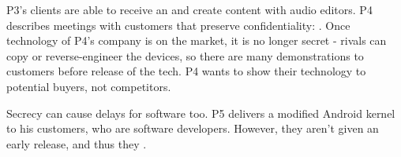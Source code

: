 P3's clients are able to receive an  and create content with audio editors.
P4 describes meetings with customers that preserve confidentiality:
.
Once technology of P4's company is on the market, it is no longer secret - rivals can copy or reverse-engineer the devices, so there are many demonstrations to customers before release of the tech.
P4 wants to show their technology to potential buyers, not competitors. %


Secrecy can cause delays for software too.
P5 delivers a modified Android kernel to his customers, who are software developers.
However, they aren't given an early release, and thus they .



